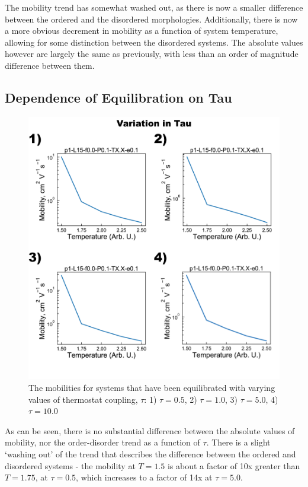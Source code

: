 \documentclass[12pt]{article}
\begin{document}
The mobility trend has somewhat washed out, as there is now a smaller difference between the ordered and the disordered morphologies.
Additionally, there is now a more obvious decrement in mobility as a function of system temperature, allowing for some distinction between the disordered systems.
The absolute values however are largely the same as previously, with less than an order of magnitude difference between them.


\subsection{Dependence of Equilibration on Tau}


\begin{figure}[h!]\centering
	\includegraphics[width=\textwidth]{Figures/Variation_in_Tau.png}
    \caption{The mobilities for systems that have been equilibrated with varying values of thermostat coupling, $\tau$:
    1) $\tau = 0.5$,
    2) $\tau = 1.0$,
    3) $\tau = 5.0$,
    4) $\tau = 10.0$}
	\label{fig:Tau}
\end{figure}


As can be seen, there is no substantial difference between the absolute values of mobility, nor the order-disorder trend as a function of $\tau$.
There is a slight `washing out' of the trend that describes the difference between the ordered and disordered systems - the mobility at $T = 1.5$ is about a factor of 10x greater than $T = 1.75$, at $\tau = 0.5$, which increases to a factor of 14x at $\tau = 5.0$.
\end{document}
